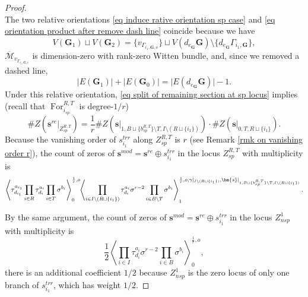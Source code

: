 \documentclass[11pt]{amsart}
\theoremstyle{definition}
\theoremstyle{remark}
\newcommand{\consta}{{\frac{1}{2}}}
\newcommand{\<}{\left<}
\renewcommand{\>}{\right>}
\numberwithin{equation}{section}
\def\Mbar{{\overline{\mathcal M}}}
\begin{document}
\begin{proof}
\begin{equation}
         \end{equation}
         The two relative orientations \eqref{eq induce rative orientation sp case} and \eqref{eq orientation product after remove dash line} coincide because we have
         $$V(\bm{G}_1)\sqcup V(\bm{G}_2)=\{v_{\Gamma_{i_1,\bm{G},o}}\}\sqcup V(d_{e_{\bm{G}}}\bm{G})\setminus \{d_{e_{\bm{G}}}\Gamma_{i_1,\bm{G}}\},$$  
         $\Mbar_{v_{\Gamma_{i_1,\bm{G},c}}}$ is dimension-zero with rank-zero Witten bundle, and, since we removed a dashed line,
         $$\lvert E(\bm{G}_1)\rvert+\lvert E(\bm{G}_0)\rvert=\lvert E(d_{e_{\bm{G}}}\bm{G})\rvert-1.$$
        Under this relative orientation, \eqref{eq split of remaining section at sp locus} implies (recall that $\operatorname{For}_{i_{sp}}^{R,T}$ is degree-$1/r$)
         $$\# Z\left( \bm{s}^{re}\vert_{Z_{sp}^{R,T}}\right)=\frac{1}{r}\#Z(\bm{s}\vert_{1,B\sqcup \{b^{R,T}_{sp}\} \setminus T,I\setminus (R\sqcup \{i_1\})})\cdot \#Z(\bm{s}\vert_{0,T,R\sqcup \{i_1\}}).$$
         Because the vanishing order of $s^{trr}_{i_1}$ along $Z_{sp}^{R,T}$ is $r$ (see Remark \ref{rmk on vanishing order r}), the count of zeros of $\bm{s}^{mod}=\bm{s}^{re}\oplus s^{trr}_{i_1}$ in the locus $Z_{sp}^{R,T}$ with multiplicity %
is
         \begin{equation}\label{eq trr sp terms}
             \left\langle \tau^{a_{i_1}}_{d_{i_1}}\prod_{i \in R} \tau^{a_i}_{d_i}\prod_{i\in T}\sigma^{b_i}\right\rangle^{\frac{1}{r},o}_0 \hspace{-0.1cm}\left\langle \prod_{i \in I\setminus(R\sqcup \{i_1\})} \tau^{a_i}_{d_i} \sigma^{r-2}\prod_{i\in B\setminus T}\sigma^{b_i}\right\rangle^{\frac{1}{r}, o,\gamma\vert_{I\setminus(R\sqcup \{i_1\})},\bm{s}\vert_{1,B\sqcup \{b^{R,T}_{sp}\} \setminus T,I\setminus (R\sqcup \{i_1\})}}_1.
         \end{equation}

         By %
the same argument, the count of zeros of $\bm{s}^{mod}=\bm{s}^{re}\oplus s^{trr}_{i_1}$ in the locus $Z_{nsp}^{1}$ with multiplicity is
         \begin{equation}\label{eq trr nsp term}
             \consta\left\langle \prod_{i\in I}\tau^{a_i}_{d_i}\sigma^{r-2}\prod_{i\in B}\sigma^{b_i}\right\rangle^{\frac{1}{r},o}_0,
         \end{equation}
         there is an additional coefficient $1/2$ because $Z_{nsp}^{1}$ is the zero locus of only one branch of $s^{trr}_{i_1}$, which has weight $1/2$.
         

\end{proof}
\end{document}
